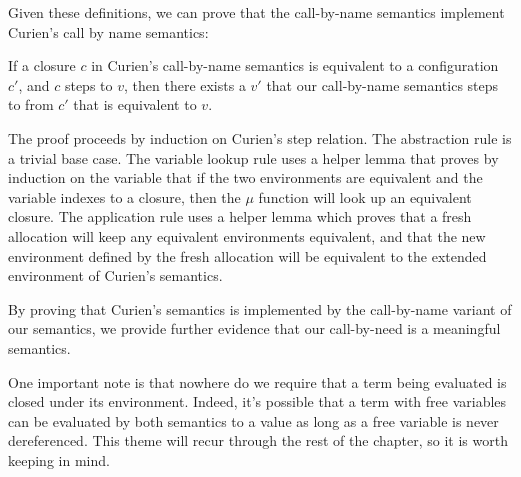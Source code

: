 Given these definitions, we can prove that the call-by-name \ce semantics
implement Curien's call by name semantics: 

\begin{thm}
If a closure $c$ in Curien's call-by-name semantics is equivalent to a
configuration $c'$, and $c$ steps to $v$, then there exists a $v'$ that our
call-by-name semantics steps to from $c'$ that is equivalent to $v$.
\end{thm}
\begin{proofoutline}
The proof proceeds by induction on Curien's step relation. The abstraction rule
is a trivial base case. The variable lookup rule uses a helper lemma that proves
by induction on the variable that if the two environments are equivalent and the
variable indexes to a closure, then the $\mu$ function will look up an
equivalent closure. The application rule uses a helper lemma which proves that a
fresh allocation will keep any equivalent environments equivalent, and that the
new environment defined by the fresh allocation will be equivalent to the
extended environment of Curien's semantics.
\end{proofoutline}

By proving that Curien's semantics is implemented by the call-by-name variant of
our semantics, we provide further evidence that our call-by-need is a meaningful
semantics. 

One important note is that nowhere do we require that a term being evaluated is
closed under its environment. Indeed, it's possible that a term with free variables
can be evaluated by both semantics to a value as long as a free variable is
never dereferenced. This theme will recur through the rest of the chapter, so it
is worth keeping in mind.  
